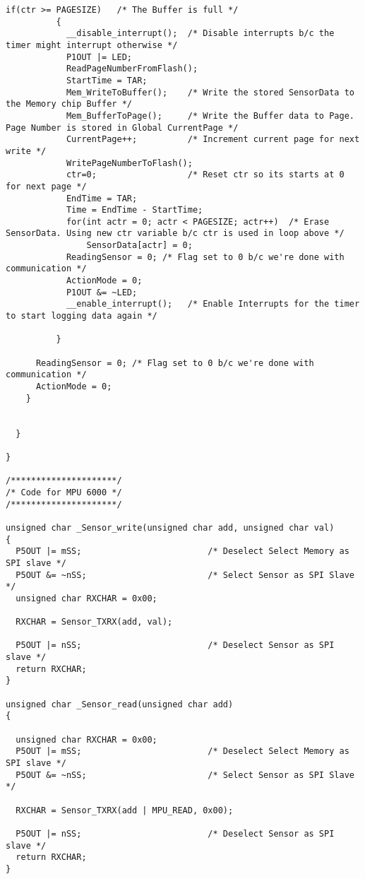 \begin{lstlisting}[caption=Main.c,label=Code4]
          if(ctr >= PAGESIZE)   /* The Buffer is full */
          {
            __disable_interrupt();	/* Disable interrupts b/c the timer might interrupt otherwise */
            P1OUT |= LED;
            ReadPageNumberFromFlash();
            StartTime = TAR;
            Mem_WriteToBuffer();	/* Write the stored SensorData to the Memory chip Buffer */
            Mem_BufferToPage();		/* Write the Buffer data to Page. Page Number is stored in Global CurrentPage */
            CurrentPage++;			/* Increment current page for next write */
            WritePageNumberToFlash();
            ctr=0;					/* Reset ctr so its starts at 0 for next page */
            EndTime = TAR;
            Time = EndTime - StartTime;
            for(int actr = 0; actr < PAGESIZE; actr++)	/* Erase SensorData. Using new ctr variable b/c ctr is used in loop above */
                SensorData[actr] = 0;
            ReadingSensor = 0; /* Flag set to 0 b/c we're done with communication */
            ActionMode = 0;
            P1OUT &= ~LED;
            __enable_interrupt();	/* Enable Interrupts for the timer to start logging data again */

          }
      
      ReadingSensor = 0; /* Flag set to 0 b/c we're done with communication */
      ActionMode = 0;
    }
    
    
  }
  
}

/*********************/
/* Code for MPU 6000 */
/*********************/

unsigned char _Sensor_write(unsigned char add, unsigned char val)
{
  P5OUT |= mSS;                         /* Deselect Select Memory as SPI slave */  
  P5OUT &= ~nSS;                        /* Select Sensor as SPI Slave */
  unsigned char RXCHAR = 0x00;
  
  RXCHAR = Sensor_TXRX(add, val);
  
  P5OUT |= nSS;                         /* Deselect Sensor as SPI slave */        
  return RXCHAR;
}

unsigned char _Sensor_read(unsigned char add)
{
  
  unsigned char RXCHAR = 0x00;
  P5OUT |= mSS;                         /* Deselect Select Memory as SPI slave */  
  P5OUT &= ~nSS;                        /* Select Sensor as SPI Slave */
  
  RXCHAR = Sensor_TXRX(add | MPU_READ, 0x00);
  
  P5OUT |= nSS;                         /* Deselect Sensor as SPI slave */   
  return RXCHAR;
}


\end{lstlisting}
